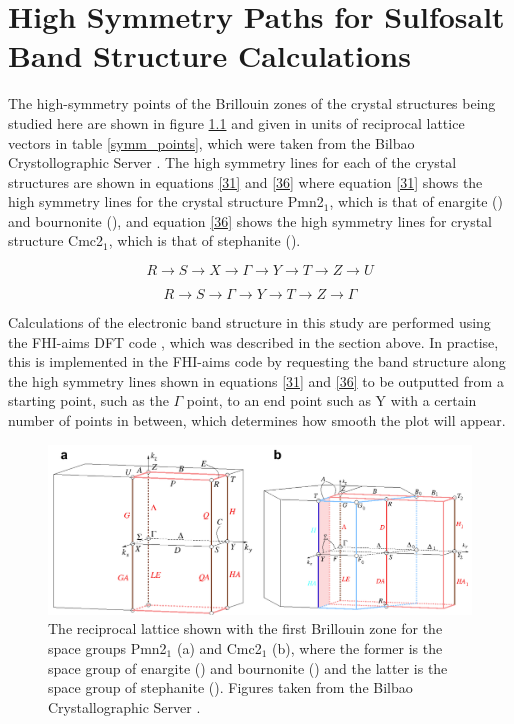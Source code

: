 \chapter{High Symmetry Paths for Sulfosalt Band Structure Calculations}\label{paths}

The high-symmetry points of the Brillouin zones of the crystal structures being studied here are shown in figure \ref{brill} and given in units of reciprocal lattice vectors in table \ref{symm_points}, which were taken from the Bilbao Crystollographic Server \cite{Bilbao, Bilbao2}.
The high symmetry lines for each of the crystal structures are shown in equations \ref{31} and \ref{36} where equation \ref{31} shows the high symmetry lines for the crystal structure Pmn2$_1$, which is that of enargite ({\enargite}) and bournonite ({\bournonite}), and equation \ref{36} shows the high symmetry lines for crystal structure Cmc2$_1$, which is that of stephanite ({\stephanite}).

\begin{equation}\label{31}
R \longrightarrow S \longrightarrow X\longrightarrow\Gamma \longrightarrow Y \longrightarrow T \longrightarrow Z \longrightarrow U
\end{equation}

\begin{equation}\label{36}
R \longrightarrow S \longrightarrow \Gamma \longrightarrow Y \longrightarrow T \longrightarrow Z \longrightarrow \Gamma
\end{equation}

Calculations of the electronic band structure in this study are performed using the FHI-aims DFT code \cite{aims}, which was described in the section above.
In practise, this is implemented in the FHI-aims code by requesting the band structure along the high symmetry lines shown in equations \ref{31} and \ref{36} to be outputted from a starting point, such as the $\Gamma$ point, to an end point such as Y with a certain number of points in between, which determines how smooth the plot will appear.

\begin{figure}[h!]
  \centering
    \includegraphics[width=1.0\textwidth]{figures/brill.png}
    \caption{The reciprocal lattice shown with the first Brillouin zone for the space groups Pmn2$_1$ (a) and Cmc2$_1$ (b), where the former is the space group of enargite ({\enargite}) and bournonite ({\bournonite}) and the latter is the space group of stephanite ({\stephanite}). Figures taken from the Bilbao Crystallographic Server \cite{Bilbao, Bilbao2}.}
  \label{brill}
\end{figure}

